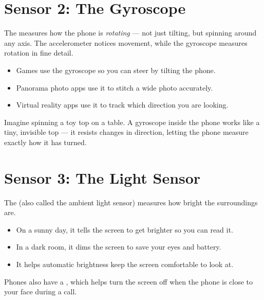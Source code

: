 \sectionrule

\section*{Sensor 2: The Gyroscope}

The  measures how the phone is \emph{rotating} —
not just tilting, but spinning around any axis.
The accelerometer notices movement, while the gyroscope measures rotation in fine detail.

\begin{itemize}
  \item Games use the gyroscope so you can steer by tilting the phone.
  \item Panorama photo apps use it to stitch a wide photo accurately.
  \item Virtual reality apps use it to track which direction you are looking.
\end{itemize}

\begin{picturethis}
  Imagine spinning a toy top on a table.
  A gyroscope inside the phone works like a tiny, invisible top —
  it resists changes in direction, letting the phone measure exactly
  how it has turned.
\end{picturethis}

\sectionrule

\section*{Sensor 3: The Light Sensor}

The  (also called the ambient light sensor) measures
how bright the surroundings are.

\begin{itemize}
  \item On a sunny day, it tells the screen to get brighter so you can read it.
  \item In a dark room, it dims the screen to save your eyes and battery.
  \item It helps automatic brightness keep the screen comfortable to look at.
\end{itemize}

Phones also have a , which helps turn the screen off
when the phone is close to your face during a call.

\sectionrule

